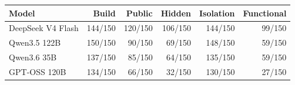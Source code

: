 \begin{tabular}{lrrrrr}
\toprule
\textbf{Model} & \textbf{Build} & \textbf{Public} & \textbf{Hidden} & \textbf{Isolation} & \textbf{Functional} \\
\midrule
DeepSeek V4 Flash & 144/150 & 120/150 & 106/150 & 144/150 & 99/150 \\
Qwen3.5 122B & 150/150 & 90/150 & 69/150 & 148/150 & 59/150 \\
Qwen3.6 35B & 137/150 & 85/150 & 64/150 & 135/150 & 59/150 \\
GPT-OSS 120B & 134/150 & 66/150 & 32/150 & 130/150 & 27/150 \\
\bottomrule
\end{tabular}
